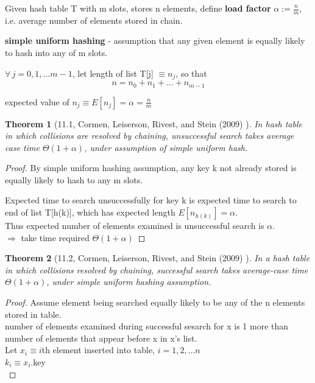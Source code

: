 \documentclass[10pt]{amsart}
\newtheorem{theorem}{Theorem}
\begin{document}
\begin{multicols*}{2}
Given hash table T with m slots, stores n elements, define \textbf{load factor} $\alpha := \frac{n}{m}$, i.e. average number of elements stored in chain.

\textbf{simple uniform hashing} - assumption that any given element is equally likely to hash into any of m slots.

$\forall \, j = 0, 1, \dots m - 1$, let length of list T[j] $\equiv n_j$, so that \\
\[
n = n_0 + n_1 + \dots + n_{m-1}
\] 

expected value of $n_j \equiv E[n_j] = \alpha = \frac{n}{m}$ \\

\begin{theorem}[11.1, Cormen, Leiserson, Rivest, and Stein (2009) \cite{CLRS2009}]
In hash table in which collisions are resolved by chaining, unsuccessful search takes average case time $\Theta(1+\alpha)$, under assumption of simple uniform hash.
\end{theorem}

\begin{proof}

By simple uniform hashing assumption, any key k not already stored is equally likely to hash to any m slots.

Expected time to search unsuccessfully for key k is expected time to search to end of list T[h(k)], which has expected length $E[n_{h(k)}] = \alpha$. \\

Thus expected number of elements examined is unsuccessful search is $\alpha$. \\
$\Longrightarrow $ take time required $\Theta(1+\alpha)$
\end{proof}


\begin{theorem}[11.2, Cormen, Leiserson, Rivest, and Stein (2009) \cite{CLRS2009}]
In a hash table in which collisions resolved by chaining, successful search takes average-case time $\Theta(1+\alpha)$, under simple uniform hashing assumption.	
\end{theorem}
\begin{proof}
Assume element being searched equally likely to be any of the n elements stored in table. \\
number of elements examined during successful sesarch for x is 1 more than number of elements that appear before x in x's list. \\
Let $x_i \equiv i$th element inserted into table, $i = 1, 2, \dots n$ \\
\phantom{Let } $k_i \equiv x_i$.key \\


\end{proof}
\end{multicols*}
\end{document}
